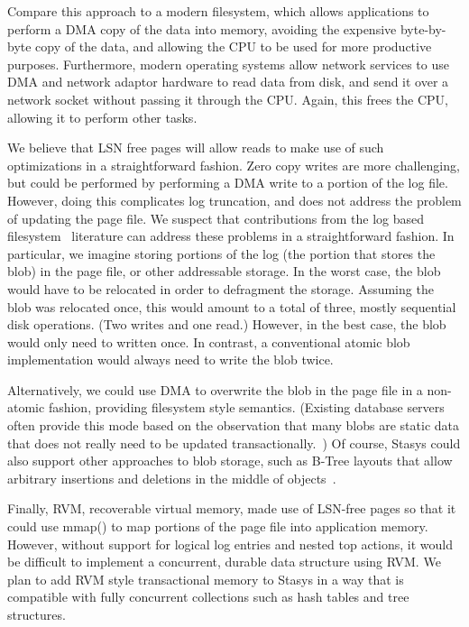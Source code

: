 \documentclass[letterpaper,twocolumn,10pt]{article}
\newcommand{\yad}{Stasys\xspace}
\begin{document}
Compare
this approach to a modern filesystem, which allows applications to
perform a DMA copy of the data into memory, avoiding the expensive
byte-by-byte copy of the data, and allowing the CPU to be used for
more productive purposes.  Furthermore, modern operating systems allow
network services to use DMA and network adaptor hardware to read data
from disk, and send it over a network socket without passing it
through the CPU.  Again, this frees the CPU, allowing it to perform
other tasks.

We believe that LSN free pages will allow reads to make use of such
optimizations in a straightforward fashion.  Zero copy writes are more challenging, but could be
performed by performing a DMA write to a portion of the log file.
However, doing this complicates log truncation, and does not address
the problem of updating the page file.  We suspect that contributions
from the log based filesystem~\cite{lfs} literature can address these problems in
a straightforward fashion.  In particular, we imagine storing 
portions of the log (the portion that stores the blob) in the 
page file, or other addressable storage.  In the worst case, 
the blob would have to be relocated in order to defragment the 
storage.  Assuming the blob was relocated once, this would amount 
to a total of three, mostly sequential disk operations.  (Two 
writes and one read.)  However, in the best case, the blob would only need to written once.
In contrast, a conventional atomic blob implementation would always need 
to write the blob twice. %

Alternatively, we could use DMA to overwrite the blob in the page file
in a non-atomic fashion, providing filesystem style semantics.
(Existing database servers often provide this mode based on the
observation that many blobs are static data that does not really need
to be updated transactionally.~\cite{sqlserver}) Of course, \yad could
also support other approaches to blob storage, such as B-Tree layouts
that allow arbitrary insertions and deletions in the middle of
objects~\cite{esm}.

Finally, RVM, recoverable virtual memory, made use of LSN-free pages
so that it could use mmap() to map portions of the page file into
application memory\cite{lrvm}.  However, without support for logical log entries
and nested top actions, it would be difficult to implement a
concurrent, durable data structure using RVM.  We plan to add RVM
style transactional memory to \yad in a way that is compatible with
fully concurrent collections such as hash tables and tree structures.
\end{document}
